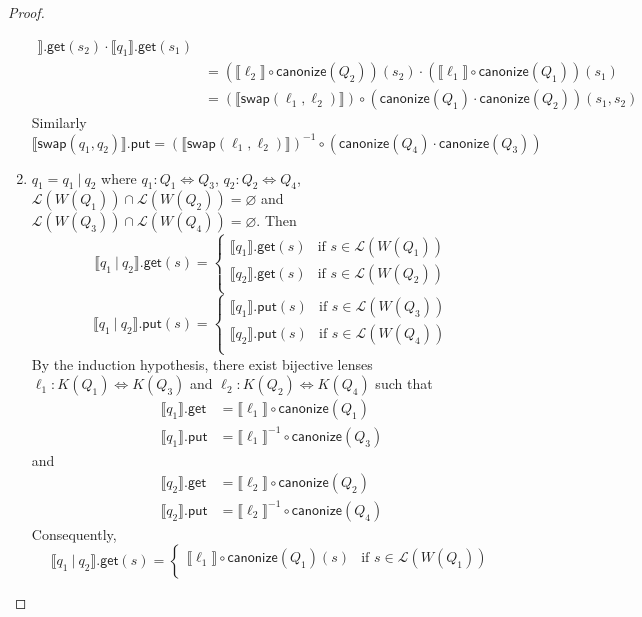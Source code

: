 \documentclass[acmsmall,review,anonymous]{acmart}
\newcommand{\codefont}[1]{\ensuremath{\mathsf{#1}}}
\newcommand{\kw}[1]{\codefont{#1}}
\newcommand{\sep}{\ensuremath{\ | \ }}
\newcommand{\canonize}{\ensuremath{\kw{canonize}}}
\newcommand{\get}{\ensuremath{\kw{get}}}
\newcommand{\lput}{\ensuremath{\kw{put}}}
\newcommand{\swap}{\ensuremath{\kw{swap}}}
\begin{document}
\begin{proof}
\begin{enumerate}
\begin{align*}
\rrbracket.\get(s_2) \cdot \llbracket q_1 \rrbracket.\get(s_1)\\
&= (\llbracket \ell_2 \rrbracket \circ
\canonize(Q_2))(s_2) \cdot  (\llbracket \ell_1 \rrbracket \circ
\canonize(Q_1))(s_1)\\
&= (\llbracket \swap(\ell_1, \ell_2) \rrbracket) \circ (\canonize(Q_1) \cdot
\canonize(Q_2)) (s_1, s_2)
\end{align*}
Similarly
$$
\llbracket \swap(q_1, q_2) \rrbracket.\lput = (\llbracket \swap(\ell_1, \ell_2)
\rrbracket)^{-1} \circ (\canonize(Q_4) \cdot \canonize(Q_3))$$
\item
$q_1 = q_1 \sep q_2$ where $q_1 : Q_1 \Leftrightarrow Q_3 $, $q_2 : Q_2
\Leftrightarrow Q_4$, $\mathcal{L}(W(Q_1)) \cap \mathcal{L}(W(Q_2)) =
\varnothing$ and $\mathcal{L}(W(Q_3)) \cap \mathcal{L}(W(Q_4)) = \varnothing$.
Then
$$
\llbracket q_1 \sep q_2 \rrbracket.\get(s) =
\begin{cases}
\llbracket q_1 \rrbracket.\get (s) & \text{if } s \in \mathcal{L}(W(Q_1))\\
\llbracket q_2 \rrbracket.\get (s) & \text{if } s \in \mathcal{L}(W(Q_2))\\
\end{cases}$$
$$\llbracket q_1 \sep q_2 \rrbracket.\lput(s) =
\begin{cases}
\llbracket q_1 \rrbracket.\lput (s) & \text{if } s \in \mathcal{L}(W(Q_3))\\
\llbracket q_2 \rrbracket.\lput (s) & \text{if } s \in \mathcal{L}(W(Q_4))\\
\end{cases}
$$
By the induction hypothesis, there exist bijective lenses $\ell_1 : K(Q_1)
\Leftrightarrow K(Q_3)$ and $\ell_2 : K(Q_2) \Leftrightarrow K(Q_4)$ such that
\begin{align*}
\llbracket q_1 \rrbracket.\get &= \llbracket \ell_1 \rrbracket \circ
\canonize(Q_1)\\
\llbracket q_1 \rrbracket.\lput &= {\llbracket \ell_1 \rrbracket}^{-1} \circ
\canonize(Q_3)
\end{align*}
and
\begin{align*}
\llbracket q_2 \rrbracket.\get &= \llbracket \ell_2 \rrbracket \circ
\canonize(Q_2)\\
\llbracket q_2 \rrbracket.\lput &= {\llbracket \ell_2 \rrbracket}^{-1} \circ
\canonize(Q_4)
\end{align*}
Consequently,
$$
\llbracket q_1 \sep q_2 \rrbracket.\get(s) =
\begin{cases}
\llbracket \ell_1 \rrbracket \circ
\canonize(Q_1) (s) & \text{if } s \in \mathcal{L}(W(Q_1))\\

\end{cases}$$
\end{enumerate}
\end{proof}
\end{document}
